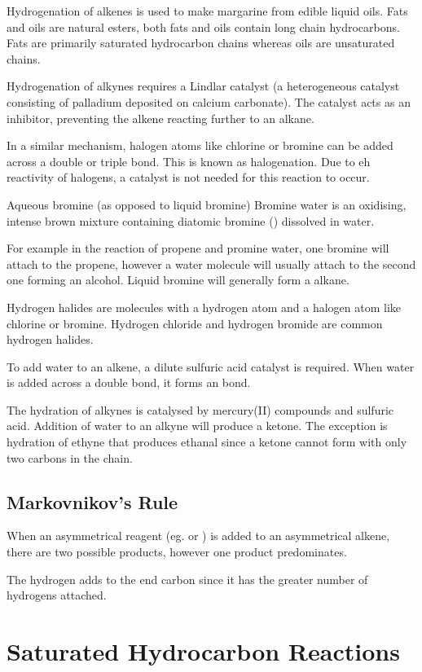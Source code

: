 	Hydrogenation of alkenes is used to make margarine from edible liquid oils. Fats and oils are natural esters, both fats and oils contain long chain hydrocarbons. Fats are primarily saturated hydrocarbon chains whereas oils are unsaturated chains.

	Hydrogenation of alkynes requires a Lindlar catalyst (a heterogeneous catalyst consisting of palladium deposited on calcium carbonate). The catalyst acts as an inhibitor, preventing the alkene reacting further to an alkane.

	In a similar mechanism, halogen atoms like chlorine or bromine can be added across a double or triple bond. This is known as halogenation. Due to eh reactivity of halogens, a catalyst is not needed for this reaction to occur.

	Aqueous bromine (as opposed to liquid bromine) Bromine water is an oxidising, intense brown mixture containing diatomic bromine () dissolved in water.

	For example in the reaction of propene and promine water, one bromine will attach to the propene, however a water molecule will usually attach to the second one forming an alcohol. Liquid bromine will generally form a alkane.

	Hydrogen halides are molecules with a hydrogen atom and a halogen atom like chlorine or bromine. Hydrogen chloride and hydrogen bromide are common hydrogen halides.

	To add water to an alkene, a dilute sulfuric acid catalyst is required. When water is added across a double bond, it forms an  bond.

	The hydration of alkynes is catalysed by mercury(II) compounds and sulfuric acid. Addition of water to an alkyne will produce a ketone. The exception is hydration of ethyne that produces ethanal since a ketone cannot form with only two carbons in the chain.

	\subsection{Markovnikov's Rule}
		
	When an asymmetrical reagent (eg.  or ) is added to an asymmetrical alkene, there are two possible products, however one product predominates.

	The hydrogen adds to the end carbon since it has the greater number of hydrogens attached.

\section{Saturated Hydrocarbon Reactions}

